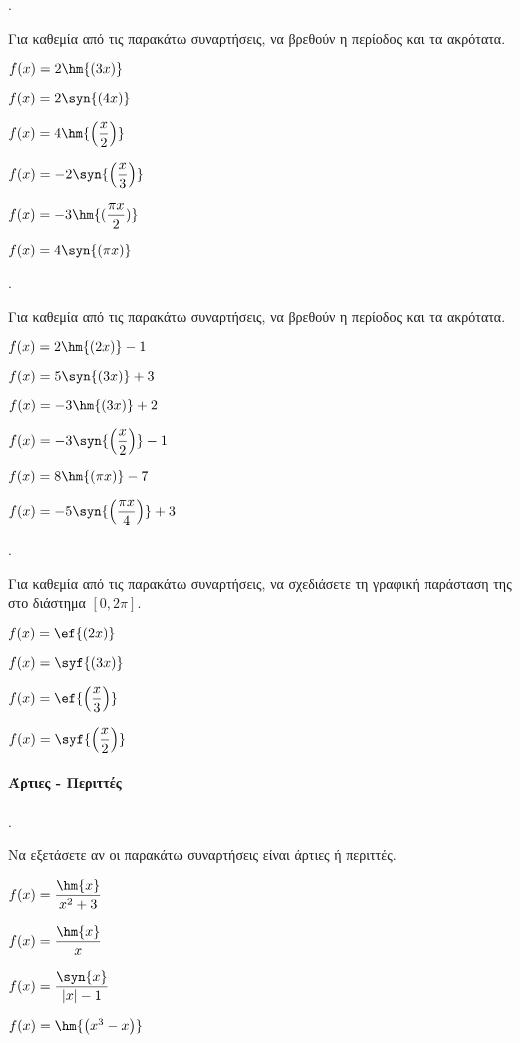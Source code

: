 \documentclass[11pt,a4paper,twocolumn]{article}
\newcounter{askhsh}
\newcommand{\askhsh}{\large\theaskhsh.\ \addtocounter{askhsh}{1}}
\begin{document}
\askhsh Για καθεμία από τις παρακάτω συναρτήσεις, να βρεθούν η περίοδος και τα ακρότατα.
\begin{multicols}{2}
\begin{alist}
\item $f(x)=2\hm{(3x)}$
\item $f(x)=2\syn{(4x)}$
\item $f(x)=4\hm{\left(\dfrac{x}{2}\right)}$
\item $f(x)=-2\syn{\left(\dfrac{x}{3}\right)}$
\item $f(x)=-3\hm{(\dfrac{\pi x}{2})}$
\item $f(x)=4\syn{\left(\pi x\right)}$
\end{alist}
\end{multicols}
\askhsh Για καθεμία από τις παρακάτω συναρτήσεις, να βρεθούν η περίοδος και τα ακρότατα.
\begin{alist}
\item $f(x)=2\hm{(2x)}-1$
\item $f(x)=5\syn{(3x)}+3$
\item $f(x)=-3\hm{(3x)}+2$
\item $f(x)=-3\syn{\left(\dfrac{x}{2}\right)}-1$
\item $f(x)=8\hm{(\pi x)}-7$
\item $f(x)=-5\syn{\left(\dfrac{\pi x}{4}\right)}+3$
\end{alist}
\askhsh Για καθεμία από τις παρακάτω συναρτήσεις, να σχεδιάσετε τη γραφική παράσταση της στο διάστημα $[0,2\pi]$.
\begin{multicols}{2}
\begin{alist}
\item $f(x)=\ef{(2x)}$
\item $f(x)=\syf{(3x)}$
\item $f(x)=\ef{\left(\dfrac{x}{3}\right)}$
\item $f(x)=\syf{\left(\dfrac{x}{2}\right)}$
\end{alist}
\end{multicols}
\paragraph{Άρτιες - Περιττές}
\askhsh Να εξετάσετε αν οι παρακάτω συναρτήσεις είναι άρτιες ή περιττές.
\begin{multicols}{2}
\begin{alist}
\item $f(x)=\dfrac{\hm{x}}{x^2+3}$
\item $f(x)=\dfrac{\hm{x}}{x}$
\item $f(x)=\dfrac{\syn{x}}{|x|-1}$
\item $f(x)=\hm{\left(x^3-x\right)}$
\end{alist}
\end{multicols}
\end{document}

